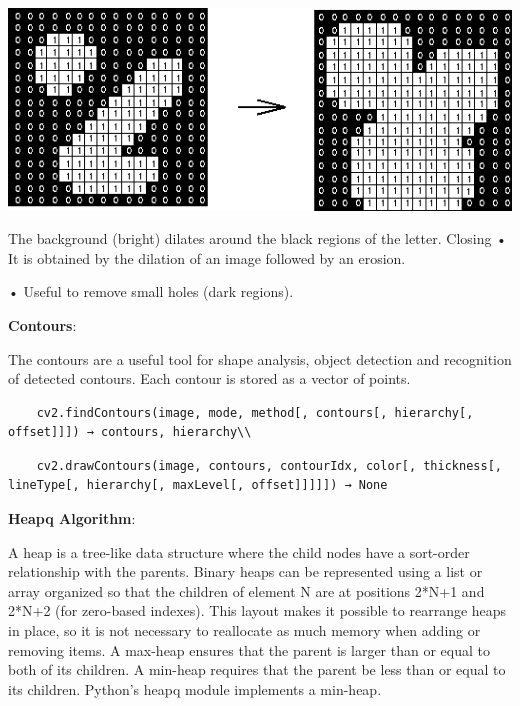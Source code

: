 \documentclass[report]{res}
\begin{document}
	\begin{center}
	\includegraphics[scale = 1]{graphics/dilation.png}
	\end{center}
		
	The background (bright) dilates around the black regions of the letter.
	Closing
	•	It is obtained by the dilation of an image followed by an erosion.
	
	•	Useful to remove small holes (dark regions).
	
	
	\textbf{Contours}:
	
	The contours are a useful tool for shape analysis, object detection and recognition of detected contours. Each contour is stored as a vector of points.
	
	\begin{lstlisting}
	cv2.findContours(image, mode, method[, contours[, hierarchy[, offset]]]) → contours, hierarchy\\
	\end{lstlisting}
	
	\begin{lstlisting}
	cv2.drawContours(image, contours, contourIdx, color[, thickness[, lineType[, hierarchy[, maxLevel[, offset]]]]]) → None
	\end{lstlisting}
	
	\textbf{Heapq Algorithm}:
	
	A heap is a tree-like data structure where the child nodes have a sort-order relationship with the parents. Binary heaps can be represented using a list or array organized so that the children of element N are at positions 2*N+1 and 2*N+2 (for zero-based indexes). This layout makes it possible to rearrange heaps in place, so it is not necessary to reallocate as much memory when adding or removing items.
	A max-heap ensures that the parent is larger than or equal to both of its children. A min-heap requires that the parent be less than or equal to its children. Python’s heapq module implements a min-heap.\\
	
\end{document}
